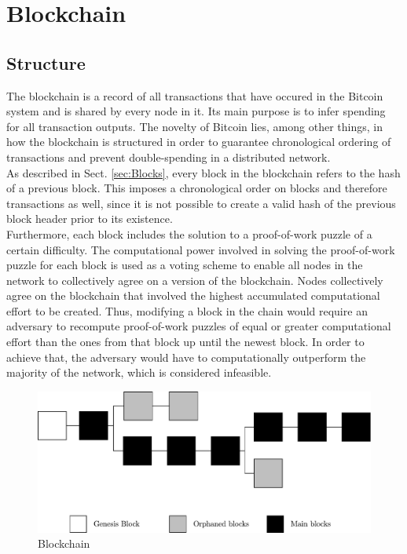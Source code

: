 \section{Blockchain} \label{sec:Blockchain}

\subsection{Structure} \label{sec:BlockchainStructure}
The blockchain is a record of all transactions that have occured in the Bitcoin system and is shared by every node in it. Its main purpose is to infer spending for all transaction outputs. The novelty of Bitcoin lies, among other things, in how the blockchain is structured in order to guarantee chronological ordering of transactions and prevent double-spending in a distributed network.~\\

\noindent
As described in Sect. \ref{sec:Blocks}, every block in the blockchain refers to the hash of a previous block. This imposes a chronological order on blocks and therefore transactions as well, since it is not possible to create a valid hash of the previous block header prior to its existence.~\\

\noindent
Furthermore, each block includes the solution to a proof-of-work puzzle of a certain difficulty. The computational power involved in solving the proof-of-work puzzle for each block is used as a voting scheme to enable all nodes in the network to collectively agree on a version of the blockchain. Nodes collectively agree on the blockchain that involved the highest accumulated computational effort to be created. Thus, modifying a block in the chain would require an adversary to recompute proof-of-work puzzles of equal or greater computational effort than the ones from that block up until the newest block. In order to achieve that, the adversary would have to computationally outperform the majority of the network, which is considered infeasible.
\begin{figure}[ht!]
 \centering
 \includegraphics[scale=0.6]{images/Blockchain.pdf}
 \caption{Blockchain}
 \label{figure:Blockchain}
\end{figure}

